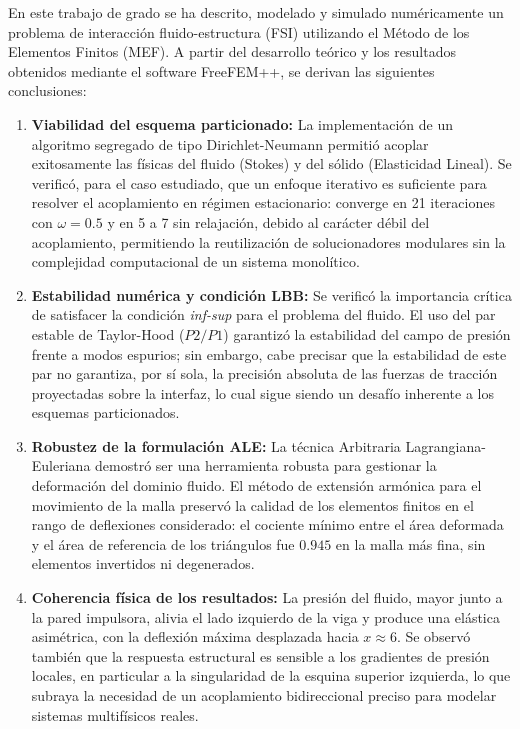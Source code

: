 \documentclass[12pt, letterpaper]{report}
\theoremstyle{definition}
\begin{document}
En este trabajo de grado se ha descrito, modelado y simulado numéricamente un problema de interacción fluido-estructura (FSI) utilizando el Método de los Elementos Finitos (MEF). A partir del desarrollo teórico y los resultados obtenidos mediante el software FreeFEM++, se derivan las siguientes conclusiones:

\begin{enumerate}
    \item \textbf{Viabilidad del esquema particionado:} La implementación de un algoritmo segregado de tipo Dirichlet-Neumann permitió acoplar exitosamente las físicas del fluido (Stokes) y del sólido (Elasticidad Lineal). Se verificó, para el caso estudiado, que un enfoque iterativo es suficiente para resolver el acoplamiento en régimen estacionario: converge en 21 iteraciones con $\omega = 0.5$ y en 5 a 7 sin relajación, debido al carácter débil del acoplamiento, permitiendo la reutilización de solucionadores modulares sin la complejidad computacional de un sistema monolítico.
    
    \item \textbf{Estabilidad numérica y condición LBB:} Se verificó la importancia crítica de satisfacer la condición \textit{inf-sup} para el problema del fluido. El uso del par estable de Taylor-Hood ($P2/P1$) garantizó la estabilidad del campo de presión frente a modos espurios; sin embargo, cabe precisar que la estabilidad de este par no garantiza, por sí sola, la precisión absoluta de las fuerzas de tracción proyectadas sobre la interfaz, lo cual sigue siendo un desafío inherente a los esquemas particionados.
    
    \item \textbf{Robustez de la formulación ALE:} La técnica Arbitraria Lagrangiana-Euleriana demostró ser una herramienta robusta para gestionar la deformación del dominio fluido. El método de extensión armónica para el movimiento de la malla preservó la calidad de los elementos finitos en el rango de deflexiones considerado: el cociente mínimo entre el área deformada y el área de referencia de los triángulos fue $0.945$ en la malla más fina, sin elementos invertidos ni degenerados.

    \item \textbf{Coherencia física de los resultados:} La presión del fluido, mayor junto a la pared impulsora, alivia el lado izquierdo de la viga y produce una elástica asimétrica, con la deflexión máxima desplazada hacia $x \approx 6$. Se observó también que la respuesta estructural es sensible a los gradientes de presión locales, en particular a la singularidad de la esquina superior izquierda, lo que subraya la necesidad de un acoplamiento bidireccional preciso para modelar sistemas multifísicos reales.


\end{enumerate}
\end{document}
